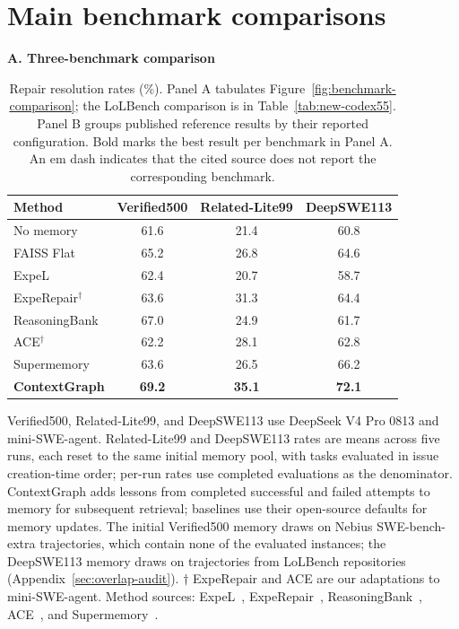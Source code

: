 \section{Main benchmark comparisons}
\label{sec:main-results-overview}
\begin{table}[!htbp]
\centering
\caption{Repair resolution rates (\%). Panel A tabulates
Figure~\ref{fig:benchmark-comparison}; the LoLBench comparison is in
Table~\ref{tab:new-codex55}. Panel B groups published reference results by
their reported configuration. Bold marks the best result per benchmark in
Panel A. An em dash indicates that the cited source does not report the
corresponding benchmark.}
\label{tab:main-results-overview}
\small
\setlength{\tabcolsep}{5pt}

\textbf{A. Three-benchmark comparison}\\[3pt]
\begin{tabular}{lccc}
\toprule
Method & Verified500 & Related-Lite99 & DeepSWE113 \\
\midrule
No memory & 61.6 & 21.4 & 60.8 \\
FAISS Flat & 65.2 & 26.8 & 64.6 \\
ExpeL & 62.4 & 20.7 & 58.7 \\
ExpeRepair$^\dagger$ & 63.6 & 31.3 & 64.4 \\
ReasoningBank & 67.0 & 24.9 & 61.7 \\
ACE$^\dagger$ & 62.2 & 28.1 & 62.8 \\
Supermemory & 63.6 & 26.5 & 66.2 \\
\textbf{ContextGraph} & \textbf{69.2} & \textbf{35.1} & \textbf{72.1} \\
\bottomrule
\end{tabular}

\smallskip
\begin{minipage}{\linewidth}\footnotesize
Verified500, Related-Lite99, and DeepSWE113 use DeepSeek V4 Pro 0813 and mini-SWE-agent.
Related-Lite99 and DeepSWE113 rates are means across five runs, each
reset to the same initial memory pool, with tasks evaluated in issue
creation-time order; per-run rates use completed evaluations as the
denominator.
ContextGraph adds lessons from completed successful and failed attempts
to memory for subsequent retrieval; baselines use their open-source
defaults for memory updates. The initial Verified500 memory draws on
Nebius SWE-bench-extra trajectories, which contain none of the evaluated
instances; the DeepSWE113 memory draws on trajectories from LoLBench
repositories (Appendix~\ref{sec:overlap-audit}).
$\dagger$ ExpeRepair and ACE are our adaptations to mini-SWE-agent.
Method sources: ExpeL~\citep{expel2024},
ExpeRepair~\citep{experepair2026}, ReasoningBank~\citep{reasoningbank2026},
ACE~\citep{ace2026}, and Supermemory~\citep{supermemoryreport2026}.
\end{minipage}


\end{table}
